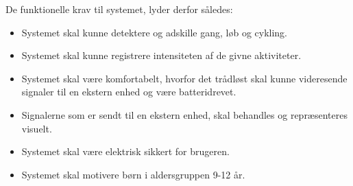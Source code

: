 De funktionelle krav til systemet, lyder derfor således: 
\begin{itemize}
	\item Systemet skal kunne detektere og adskille gang, løb og cykling.
	\item Systemet skal kunne registrere intensiteten af de givne aktiviteter.
	\item Systemet skal være komfortabelt, hvorfor det trådløst skal kunne videresende signaler til en ekstern enhed og være batteridrevet.
	\item Signalerne som er sendt til en ekstern enhed, skal behandles og repræsenteres visuelt.
	\item Systemet skal være elektrisk sikkert for brugeren.
	\item Systemet skal motivere børn i aldersgruppen 9-12 år. 
\end{itemize}










